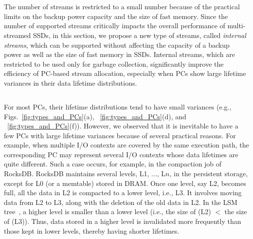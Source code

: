 \vspace{-10pt}
\section{}
\label{sec:internal}
\vspace{-5pt}
The number of streams is restricted to a small number 
because of the practical limits on the backup power capacity and the size of fast memory.
Since the number of supported streams critically impacts the overall performance 
of multi-streamed SSDs, in this section, we propose a new type of streams, 
called {\it internal streams}, which can be
supported without affecting the capacity of a backup power as well as 
the size of fast memory in SSDs.   
Internal streams, which are restricted to be used only for garbage collection, 
significantly improve the efficiency of PC-based stream allocation,
especially when PCs show large lifetime variances in their data lifetime
distributions.

\vspace{-10pt}
\subsection{}
\vspace{-5pt}
For most PCs, their lifetime distributions tend to have small variances
(e.g., Figs.~\ref{fig:types_and_PCs}(a), ~\ref{fig:types_and_PCs}(d), and
~\ref{fig:types_and_PCs}(f)).
However, we observed that 
it is inevitable to have a few PCs with large lifetime variances 
because of several practical reasons.
For example, when multiple I/O contexts are covered by the same execution path, 
the corresponding PC may represent several I/O contexts whose data lifetimes are quite different.   
Such a case occurs, for example, 
in the compaction job of RocksDB.
RocksDB maintains
several levels, L1, ..., L$n$, in the persistent storage, except for L0 (or a
memtable) stored in DRAM.  Once one level, say L2, becomes full, all the data
in L2 is compacted to a lower level, i.e., L3.  It involves moving data from L2
to L3, along with the deletion of the old data in L2.  In the
LSM tree~\cite{LSM}, a higher level is smaller than a lower level 
(i.e., the size of (L2) $<$ the size of (L3)). 
Thus, data stored in a higher level is invalidated more frequently than those kept
in lower levels, thereby having shorter lifetimes.

